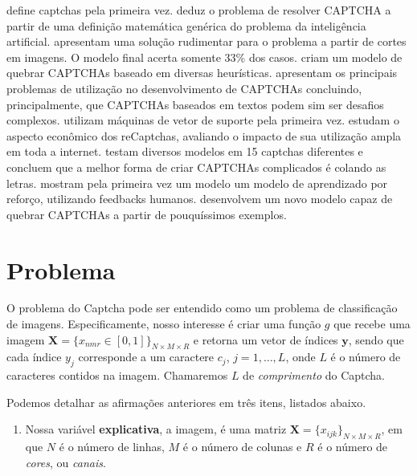 \documentclass[12pt,]{report}
\providecommand{\tightlist}{%
  \setlength{\itemsep}{0pt}\setlength{\parskip}{0pt}}
\begin{document}
\citep{von2002telling} define captchas pela primeira vez.
\citet{von2003captcha} deduz o problema de resolver CAPTCHA a partir de
uma definição matemática genérica do problema da inteligência
artificial. \citet{mori2003recognizing} apresentam uma solução
rudimentar para o problema a partir de cortes em imagens. O modelo final
acerta somente 33\% dos casos. \citet{yan2008low} criam um modelo de
quebrar CAPTCHAs baseado em diversas heurísticas.
\citet{yan2008usability} apresentam os principais problemas de
utilização no desenvolvimento de CAPTCHAs concluindo, principalmente,
que CAPTCHAs baseados em textos podem sim ser desafios complexos.
\citet{golle2008machine} utilizam máquinas de vetor de suporte pela
primeira vez. \citet{motoyama2010re} estudam o aspecto econômico dos
reCaptchas, avaliando o impacto de sua utilização ampla em toda a
internet. \citet{bursztein2011text} testam diversos modelos em 15
captchas diferentes e concluem que a melhor forma de criar CAPTCHAs
complicados é colando as letras. \citet{bursztein2014end} mostram pela
primeira vez um modelo um modelo de aprendizado por reforço, utilizando
feedbacks humanos. \citet{george2017generative} desenvolvem um novo
modelo capaz de quebrar CAPTCHAs a partir de pouquíssimos exemplos.

\chapter{Problema}\label{problema}

O problema do Captcha pode ser entendido como um problema de
classificação de imagens. Especificamente, nosso interesse é criar uma
função \(g\) que recebe uma imagem
\(\mathbf X = \{x_{nmr} \in [0,1]\}_{N\times M \times R}\) e retorna um
vetor de índices \(\mathbf y\), sendo que cada índice \(y_j\)
corresponde a um caractere \(c_j\), \(j = 1, \dots, L\), onde \(L\) é o
número de caracteres contidos na imagem. Chamaremos \(L\) de
\emph{comprimento} do Captcha.

Podemos detalhar as afirmações anteriores em três itens, listados
abaixo.

\begin{enumerate}
\def\labelenumi{\arabic{enumi}.}
\tightlist
\item
  Nossa variável \textbf{explicativa}, a imagem, é uma matriz
  \(\mathbf X = \{x_{ijk}\}_{N\times M \times R}\), em que \(N\) é o
  número de linhas, \(M\) é o número de colunas e \(R\) é o número de
  \emph{cores}, ou \emph{canais}.
\end{enumerate}
\end{document}
